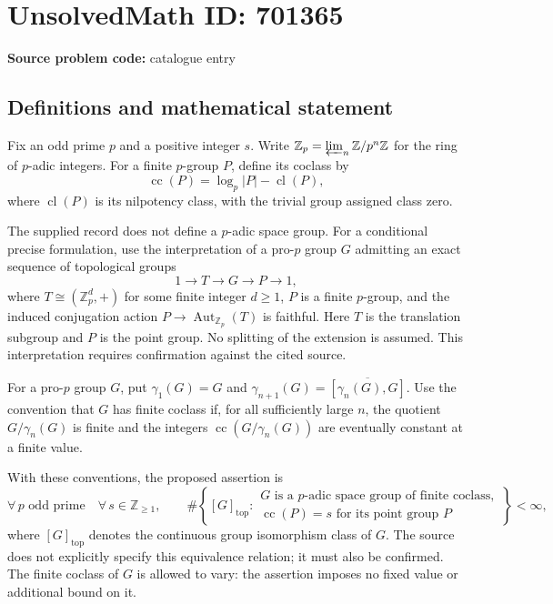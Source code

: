 \documentclass[11pt]{article}
\newcommand{\Z}{\mathbb{Z}}
\begin{document}
\section*{UnsolvedMath ID: 701365}
\textbf{Source problem code:} catalogue entry
\subsection{Definitions and mathematical statement}
Fix an odd prime \(p\) and a positive integer \(s\). Write \(\Z_p=\varprojlim_n\Z/p^n\Z\) for the ring of \(p\)-adic integers. For a finite \(p\)-group \(P\), define its coclass by
\[
\operatorname{cc}(P)=\log_p|P|-\operatorname{cl}(P),
\]
where \(\operatorname{cl}(P)\) is its nilpotency class, with the trivial group assigned class zero.

The supplied record does not define a \(p\)-adic space group. For a conditional precise formulation, use the interpretation of a pro-\(p\) group \(G\) admitting an exact sequence of topological groups
\[
1\longrightarrow T\longrightarrow G\longrightarrow P\longrightarrow 1,
\]
where \(T\cong(\Z_p^d,+)\) for some finite integer \(d\geq1\), \(P\) is a finite \(p\)-group, and the induced conjugation action \(P\longrightarrow\operatorname{Aut}_{\Z_p}(T)\) is faithful. Here \(T\) is the translation subgroup and \(P\) is the point group. No splitting of the extension is assumed. This interpretation requires confirmation against the cited source.

For a pro-\(p\) group \(G\), put \(\gamma_1(G)=G\) and \(\gamma_{n+1}(G)=\overline{[\gamma_n(G),G]}\). Use the convention that \(G\) has finite coclass if, for all sufficiently large \(n\), the quotient \(G/\gamma_n(G)\) is finite and the integers \(\operatorname{cc}(G/\gamma_n(G))\) are eventually constant at a finite value.

With these conventions, the proposed assertion is
\[
\forall\,p\text{ odd prime}\quad\forall\,s\in\Z_{\geq1},\qquad
\#\left\{[G]_{\mathrm{top}}:\begin{array}{l}
G\text{ is a }p\text{-adic space group of finite coclass},\\
\operatorname{cc}(P)=s\text{ for its point group }P
\end{array}\right\}<\infty,
\]
where \([G]_{\mathrm{top}}\) denotes the continuous group isomorphism class of \(G\). The source does not explicitly specify this equivalence relation; it must also be confirmed. The finite coclass of \(G\) is allowed to vary: the assertion imposes no fixed value or additional bound on it.
\end{document}
